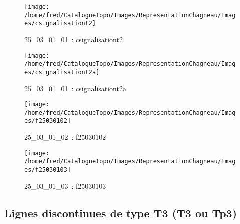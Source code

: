\documentclass[12pt,titlepage]{book}
\begin{document}
\begin{figure}[h!]
  \hfill         %
  \begin{minipage}[t]{3cm}
    \begin{center}
      \texttt{[image: /home/fred/CatalogueTopo/Images/RepresentationChagneau/Images/csignalisationt2]}
      \caption[~25\_03\_01\_01]{\small{25\_03\_01\_01~:} \tiny{csignalisationt2}}\label{csignalisationt2}
    \end{center}
  \end{minipage}
  \begin{minipage}[t]{3cm}
    \begin{center}
      \texttt{[image: /home/fred/CatalogueTopo/Images/RepresentationChagneau/Images/csignalisationt2a]}
      \caption[~25\_03\_01\_01]{\small{25\_03\_01\_01~:} \tiny{csignalisationt2a}}\label{csignalisationt2a}
    \end{center}
  \end{minipage}
  \begin{minipage}[t]{3cm}
    \begin{center}
      \texttt{[image: /home/fred/CatalogueTopo/Images/RepresentationChagneau/Images/f25030102]}
      \caption[~25\_03\_01\_02]{\small{25\_03\_01\_02~:} \tiny{f25030102}}\label{f25030102}
    \end{center}
  \end{minipage}
  \begin{minipage}[t]{3cm}
    \begin{center}
      \texttt{[image: /home/fred/CatalogueTopo/Images/RepresentationChagneau/Images/f25030103]}
      \caption[~25\_03\_01\_03]{\small{25\_03\_01\_03~:} \tiny{f25030103}}\label{f25030103}
    \end{center}
  \end{minipage}
\end{figure}


\subsection{Lignes discontinues de type T3 (T3 ou Tp3)}
\noindent
\vspace{\baselineskip}
\end{document}
